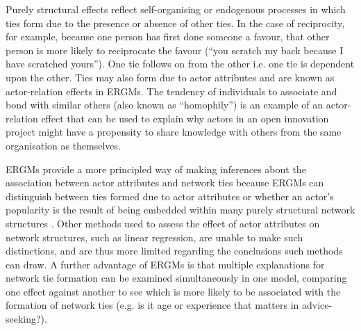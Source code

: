 Purely structural effects reflect self-organising or endogenous processes in which ties form due to the presence or absence of other ties. In the case of reciprocity, for example, because one person has first done someone a favour, that other person is more likely to reciprocate the favour (\enquote{you scratch my back because I have scratched yours}). One tie follows on from the other i.e. one tie is dependent upon the other. Ties may also form due to actor attributes and are known as actor-relation effects in ERGMs. The tendency of individuals to associate and bond with similar others (also known as \enquote{homophily}) is an example of an actor-relation effect that can be used to explain why actors in an open innovation project might have a propensity to share knowledge with others from the same organisation as themselves. 

ERGMs provide a more principled way of making inferences about the association between actor attributes and network ties because ERGMs can distinguish between ties formed due to actor attributes or whether an actor’s popularity is the result of being embedded within many purely structural network structures \citep{lusher2013exponential}. Other methods used to assess the effect of actor attributes on network structures, such as linear regression, are unable to make such distinctions, and are thus more limited regarding the conclusions such methods can draw. A further advantage of ERGMs is that multiple explanations for network tie formation can be examined simultaneously in one model, comparing one effect against another to see which is more likely to be associated with the formation of network ties (e.g. is it age or experience that matters in advice-seeking?).